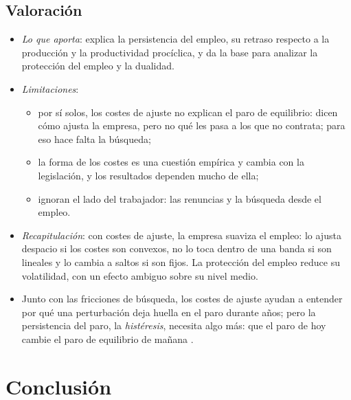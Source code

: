 \documentclass[11pt]{article}
\begin{document}
\subsection{Valoración}\label{sec:ajuste-valoracion}

\begin{itemize}
\item \emph{Lo que aporta}: explica la persistencia del empleo, su retraso respecto a la producción y la productividad procíclica, y da la base para analizar la protección del empleo y la dualidad.
\item \emph{Limitaciones}:
  \begin{itemize}
  \item por sí solos, los costes de ajuste no explican el paro de equilibrio: dicen cómo ajusta la empresa, pero no qué les pasa a los que no contrata; para eso hace falta la búsqueda;
  \item la forma de los costes es una cuestión empírica y cambia con la legislación, y los resultados dependen mucho de ella;
  \item ignoran el lado del trabajador: las renuncias y la búsqueda desde el empleo.
  \end{itemize}
\item \emph{Recapitulación}: con costes de ajuste, la empresa suaviza el empleo: lo ajusta despacio si los costes son convexos, no lo toca dentro de una banda si son lineales y lo cambia a saltos si son fijos. La protección del empleo reduce su volatilidad, con un efecto ambiguo sobre su nivel medio.
\item Junto con las fricciones de búsqueda, los costes de ajuste ayudan a entender por qué una perturbación deja huella en el paro durante años; pero la persistencia del paro, la \emph{histéresis}, necesita algo más: que el paro de hoy cambie el paro de equilibrio de mañana .
\end{itemize}


\section*{Conclusión}
\end{document}
